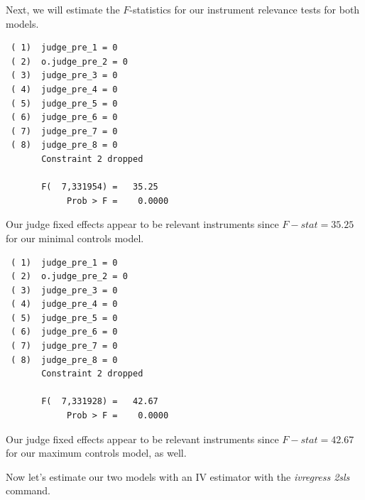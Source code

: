 \documentclass[
]{book}
\newenvironment{Shaded}{\begin{snugshade}}{\end{snugshade}}
\newcommand{\KeywordTok}[1]{\textcolor[rgb]{0.13,0.29,0.53}{\textbf{#1}}}
\newcommand{\NormalTok}[1]{#1}
\newcommand{\OtherTok}[1]{\textcolor[rgb]{0.56,0.35,0.01}{#1}}
\begin{document}
Next, we will estimate the \(F\)-statistics for our instrument relevance tests for both models.

\begin{Shaded}
\end{Shaded}

\begin{verbatim}
 ( 1)  judge_pre_1 = 0
 ( 2)  o.judge_pre_2 = 0
 ( 3)  judge_pre_3 = 0
 ( 4)  judge_pre_4 = 0
 ( 5)  judge_pre_5 = 0
 ( 6)  judge_pre_6 = 0
 ( 7)  judge_pre_7 = 0
 ( 8)  judge_pre_8 = 0
       Constraint 2 dropped

       F(  7,331954) =   35.25
            Prob > F =    0.0000
\end{verbatim}

Our judge fixed effects appear to be relevant instruments since \(F-stat=35.25\) for our minimal controls model.

\begin{Shaded}
\end{Shaded}

\begin{verbatim}
 ( 1)  judge_pre_1 = 0
 ( 2)  o.judge_pre_2 = 0
 ( 3)  judge_pre_3 = 0
 ( 4)  judge_pre_4 = 0
 ( 5)  judge_pre_5 = 0
 ( 6)  judge_pre_6 = 0
 ( 7)  judge_pre_7 = 0
 ( 8)  judge_pre_8 = 0
       Constraint 2 dropped

       F(  7,331928) =   42.67
            Prob > F =    0.0000
\end{verbatim}

Our judge fixed effects appear to be relevant instruments since \(F-stat=42.67\) for our maximum controls model, as well.

Now let's estimate our two models with an IV estimator with the \emph{ivregress 2sls} command.
\end{document}
